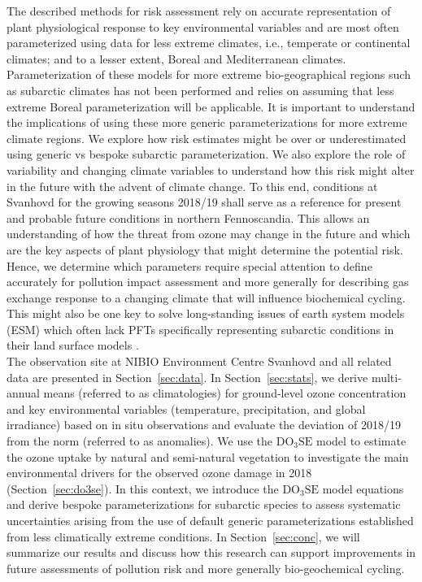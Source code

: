 \documentclass[bg, manuscript]{copernicus}
\begin{document}
The described methods for risk assessment rely on accurate representation of plant physiological response to key environmental variables and are most often parameterized using data for less extreme climates, i.e., temperate or continental climates; and to a lesser extent, Boreal and Mediterranean climates. Parameterization of these models for more extreme bio-geographical regions such as subarctic climates has not been performed and relies on assuming that less extreme Boreal parameterization will be applicable. It is important to understand the implications of using these more generic parameterizations for more extreme climate regions. We explore how risk estimates might be over or underestimated using generic vs bespoke subarctic parameterization. We also explore the role of \chem{[O_3]} variability and changing climate variables to understand how this risk might alter in the future with the advent of climate change. To this end, conditions at Svanhovd for the growing seasons 2018/19 shall serve as a reference for present and probable future conditions in northern Fennoscandia.
This allows an understanding of how the threat from ozone may change in the future and which are the key aspects of plant physiology that might determine the potential risk. Hence, we determine which parameters require special attention to define accurately for pollution impact assessment and more generally for describing gas exchange response to a changing climate that will influence biochemical cycling. This might also be one key to solve long-standing issues of earth system models (ESM) which often lack PFTs specifically representing subarctic conditions in their land surface models \citep{GMD:Poulter2015,JAMES:Lawrence2019}.\\

The observation site at NIBIO Environment Centre Svanhovd and all related data are presented in Section~\ref{sec:data}. In Section~\ref{sec:stats}, we derive multi-annual means (referred to as climatologies) for ground-level ozone concentration and key environmental variables (temperature, precipitation, and global irradiance) based on in situ observations and evaluate the deviation of 2018/19 from the norm (referred to as anomalies). We use the $\mathrm{DO_3SE}$ model to estimate the ozone uptake by natural and semi-natural vegetation to investigate the main environmental drivers for the observed ozone damage in 2018 (Section~\ref{sec:do3se}). In this context, we introduce the $\mathrm{DO_3SE}$ model equations and derive bespoke parameterizations for subarctic species to assess systematic uncertainties arising from the use of default generic parameterizations established from less climatically extreme conditions. In Section~\ref{sec:conc}, we will summarize our results and discuss how this research can support improvements in future assessments of pollution risk and more generally bio-geochemical cycling.
\end{document}
